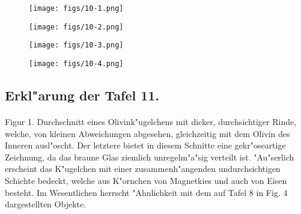\documentclass[a4paper, 11pt, oneside, polutonikogreek, german]{article}
\begin{document}
\vspace*{\fill}
\begin{figure}[H]
\centering
\texttt{[image: figs/10-1.png]}
\caption{}
\end{figure}
\vspace*{\fill}
\clearpage

\vspace*{\fill}
\begin{figure}[H]
\centering
\texttt{[image: figs/10-2.png]}
\caption{}
\end{figure}
\vspace*{\fill}
\clearpage

\vspace*{\fill}
\begin{figure}[H]
\centering
\texttt{[image: figs/10-3.png]}
\caption{}
\end{figure}
\vspace*{\fill}
\clearpage

\vspace*{\fill}
\begin{figure}[H]
\centering
\texttt{[image: figs/10-4.png]}
\caption{}
\end{figure}
\vspace*{\fill}
\clearpage

\subsection{Erkl"arung der Tafel 11.}
\paragraph{}
Figur 1. Durchschnitt eines Olivink"ugelchens mit dicker, durchsichtiger Rinde, welche, von kleinen Abweichungen abgesehen, gleichzeitig mit dem Olivin des Inneren ausl"oscht. Der letztere bietet in diesem Schnitte eine gekr"oseartige Zeichnung, da das braune Glas ziemlich unregelm"a"sig verteilt ist. "Au"serlich erscheint das K"ugelchen mit einer zusammenh"angenden undurchsichtigen Schichte bedeckt, welche aus K"ornchen von Magnetkies und auch von Eisen besteht. Im Wesentlichen herrscht "Ahnlichkeit mit dem auf Tafel 8 in Fig. 4 dargestellten Objekte.
\end{document}

